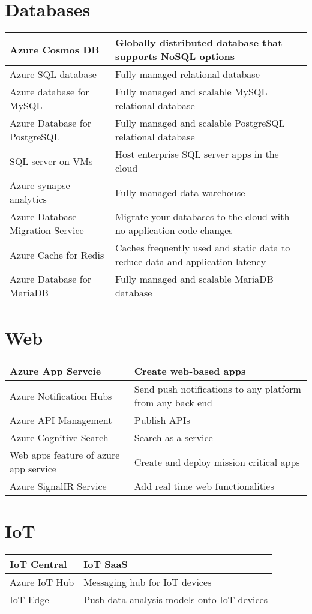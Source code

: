 \documentclass{article}[18pt]
\begin{document}
\section{Databases}
{\renewcommand{\arraystretch}{2}
	\begin{tabularx}{\textwidth}{X X}
		
		Azure Cosmos DB& Globally distributed database that supports NoSQL options\\
		\hline
		Azure SQL database& Fully managed relational database\\
		\hline
		Azure database for MySQL& Fully managed and scalable MySQL relational database\\
		\hline
		Azure Database for PostgreSQL & Fully managed and scalable PostgreSQL relational database\\
		\hline 
		SQL server on VMs& Host enterprise SQL server apps in the cloud\\
		\hline
		Azure synapse analytics& Fully managed data warehouse\\
		\hline
		Azure Database Migration Service& Migrate your databases to the cloud with no application code changes\\
		\hline
		Azure Cache for Redis& Caches frequently used and static data to reduce data and application latency\\
		\hline
		Azure Database for MariaDB& Fully managed and scalable MariaDB database
		
		
	\end{tabularx}
}
\section{Web}
{\renewcommand{\arraystretch}{2}
	\begin{tabularx}{\textwidth}{X X}
		
		Azure App Servcie & Create web-based apps\\
		\hline
		Azure Notification Hubs& Send push notifications to any platform from any back end\\
		\hline
		Azure API Management& Publish APIs\\
		\hline
		Azure Cognitive Search& Search as a service\\
		\hline
		Web apps feature of azure app service& Create and deploy mission critical apps\\
		\hline
		Azure SignalIR Service & Add real time web functionalities
		
		
	\end{tabularx}
}
\section{IoT}
{\renewcommand{\arraystretch}{2}
	\begin{tabularx}{\textwidth}{X X}
		
		IoT Central& IoT SaaS\\
		\hline
		Azure IoT Hub& Messaging hub for IoT devices\\
		\hline
		IoT Edge& Push data analysis models onto IoT devices
		
		
		
	\end{tabularx}
}
\end{document}
